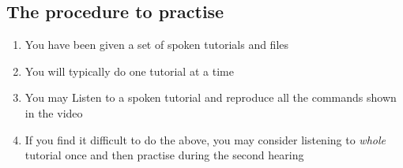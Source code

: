 \documentclass[11pt]{article}
\newenvironment{enumcpt}{\begin{enumerate} \topsep 0pt \partopsep 0pt 
                        \parsep 0pt
                        \itemsep 0pt \leftmargin -1in \rightmargin 0pt
                        }{\end{enumerate}}
\begin{document}
\begin{multicols}{2}

\section{The procedure to practise}
\begin{enumcpt}
\item You have been given a set of spoken tutorials and files
\item You will typically do one tutorial at a time
\item You may Listen to a spoken tutorial and reproduce all the
  commands shown in the video
\item If you find it difficult to do the above, you may consider
  listening to \emph{whole} tutorial once and then practise during
  the second hearing
\end{enumcpt}


\end{multicols}
\end{document}
